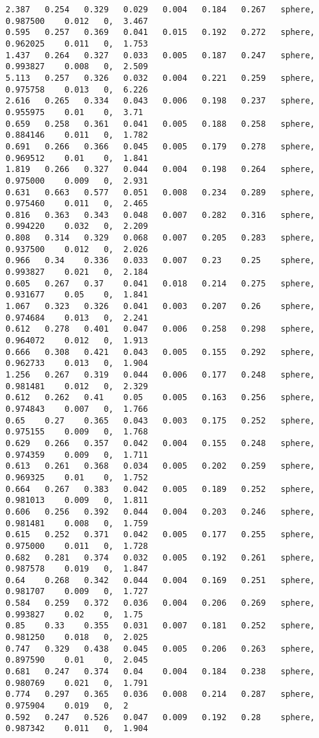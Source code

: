 {\begin{lstlisting}[caption={Datos obtenidos para la prueba de la esfera usando AE.}]
2.387	0.254	0.329	0.029	0.004	0.184	0.267	sphere, 	0.987500	0.012	0, 	3.467
0.595	0.257	0.369	0.041	0.015	0.192	0.272	sphere, 	0.962025	0.011	0, 	1.753
1.437	0.264	0.327	0.033	0.005	0.187	0.247	sphere, 	0.993827	0.008	0, 	2.509
5.113	0.257	0.326	0.032	0.004	0.221	0.259	sphere, 	0.975758	0.013	0, 	6.226
2.616	0.265	0.334	0.043	0.006	0.198	0.237	sphere, 	0.955975	0.01	0, 	3.71
0.659	0.258	0.361	0.041	0.005	0.188	0.258	sphere, 	0.884146	0.011	0, 	1.782
0.691	0.266	0.366	0.045	0.005	0.179	0.278	sphere, 	0.969512	0.01	0, 	1.841
1.819	0.266	0.327	0.044	0.004	0.198	0.264	sphere, 	0.975000	0.009	0, 	2.931
0.631	0.663	0.577	0.051	0.008	0.234	0.289	sphere, 	0.975460	0.011	0, 	2.465
0.816	0.363	0.343	0.048	0.007	0.282	0.316	sphere, 	0.994220	0.032	0, 	2.209
0.808	0.314	0.329	0.068	0.007	0.205	0.283	sphere, 	0.937500	0.012	0, 	2.026
0.966	0.34	0.336	0.033	0.007	0.23	0.25	sphere, 	0.993827	0.021	0, 	2.184
0.605	0.267	0.37	0.041	0.018	0.214	0.275	sphere, 	0.931677	0.05	0, 	1.841
1.067	0.323	0.326	0.041	0.003	0.207	0.26	sphere, 	0.974684	0.013	0, 	2.241
0.612	0.278	0.401	0.047	0.006	0.258	0.298	sphere, 	0.964072	0.012	0, 	1.913
0.666	0.308	0.421	0.043	0.005	0.155	0.292	sphere, 	0.962733	0.013	0, 	1.904
1.256	0.267	0.319	0.044	0.006	0.177	0.248	sphere, 	0.981481	0.012	0, 	2.329
0.612	0.262	0.41	0.05	0.005	0.163	0.256	sphere, 	0.974843	0.007	0, 	1.766
0.65	0.27	0.365	0.043	0.003	0.175	0.252	sphere, 	0.975155	0.009	0, 	1.768
0.629	0.266	0.357	0.042	0.004	0.155	0.248	sphere, 	0.974359	0.009	0, 	1.711
0.613	0.261	0.368	0.034	0.005	0.202	0.259	sphere, 	0.969325	0.01	0, 	1.752
0.664	0.267	0.383	0.042	0.005	0.189	0.252	sphere, 	0.981013	0.009	0, 	1.811
0.606	0.256	0.392	0.044	0.004	0.203	0.246	sphere, 	0.981481	0.008	0, 	1.759
0.615	0.252	0.371	0.042	0.005	0.177	0.255	sphere, 	0.975000	0.011	0, 	1.728
0.682	0.281	0.374	0.032	0.005	0.192	0.261	sphere, 	0.987578	0.019	0, 	1.847
0.64	0.268	0.342	0.044	0.004	0.169	0.251	sphere, 	0.981707	0.009	0, 	1.727
0.584	0.259	0.372	0.036	0.004	0.206	0.269	sphere, 	0.993827	0.02	0, 	1.75
0.85	0.33	0.355	0.031	0.007	0.181	0.252	sphere, 	0.981250	0.018	0, 	2.025
0.747	0.329	0.438	0.045	0.005	0.206	0.263	sphere, 	0.897590	0.01	0, 	2.045
0.681	0.247	0.374	0.04	0.004	0.184	0.238	sphere, 	0.980769	0.021	0, 	1.791
0.774	0.297	0.365	0.036	0.008	0.214	0.287	sphere, 	0.975904	0.019	0, 	2
0.592	0.247	0.526	0.047	0.009	0.192	0.28	sphere, 	0.987342	0.011	0, 	1.904
\end{lstlisting}
}$ $ \\


